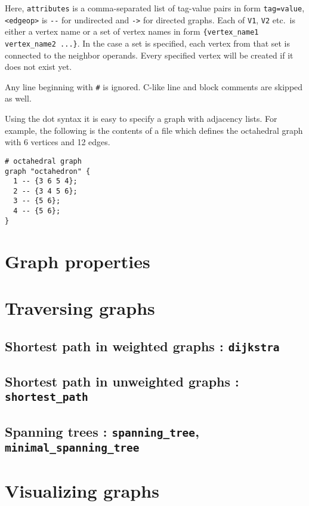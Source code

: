 \documentclass[a4paper,11pt]{article}
\begin{document}
Here, {\tt attributes} is a comma-separated list of tag-value pairs in form {\tt tag=value}, {\tt <edgeop>} is \verb|--| for undirected and {\tt ->} for directed graphs. Each of {\tt V1}, {\tt V2} etc.~is either a vertex name or a set of vertex names in form {\tt \{vertex\_name1 vertex\_name2 ...\}}. In the case a set is specified, each vertex from that set is connected to the neighbor operands. Every specified vertex will be created if it does not exist yet.

Any line beginning with {\tt \#} is ignored. C-like line and block comments are skipped as well.

Using the {\sf dot} syntax it is easy to specify a graph with adjacency lists. For example, the following is the contents of a file which defines the octahedral graph with 6 vertices and 12 edges.
\begin{verbatim}
# octahedral graph
graph "octahedron" {
  1 -- {3 6 5 4};
  2 -- {3 4 5 6};
  3 -- {5 6};
  4 -- {5 6};
}
\end{verbatim}

\section{Graph properties}

\section{Traversing graphs}

\subsection{Shortest path in weighted graphs : {\tt dijkstra}}

\subsection{Shortest path in unweighted graphs : {\tt shortest\_path}}

\subsection{Spanning trees : {\tt spanning\_tree}, {\tt minimal\_spanning\_tree}}

\section{Visualizing graphs}
\end{document}
